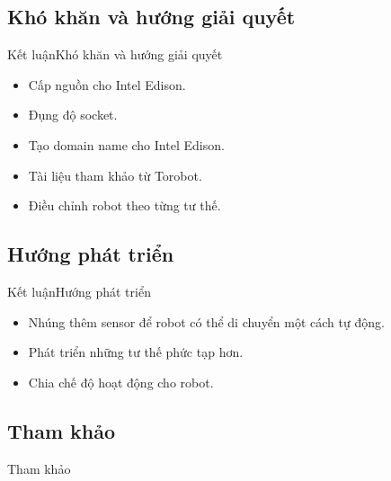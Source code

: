 \documentclass[compress, blue, 13pt,hyperref={pdfpagemode=FullScreen}]{beamer}
\begin{document}
\subsection{Khó khăn và hướng giải quyết}
\begin{frame}{Kết luận}{Khó khăn và hướng giải quyết}
\begin{itemize}
\item Cấp nguồn cho Intel Edison.
\item Đụng độ socket.
\item Tạo domain name cho Intel Edison.
\item Tài liệu tham khảo từ Torobot.
\item Điều chỉnh robot theo từng tư thế.
\end{itemize}
\end{frame}
\subsection{Hướng phát triển}
\begin{frame}{Kết luận}{Hướng phát triển}
\begin{itemize}
\item Nhúng thêm sensor để robot có thể di chuyển một cách tự động.
\item Phát triển những tư thế phức tạp hơn. 
\item Chia chế độ hoạt động cho robot.
\end{itemize}
\end{frame}
\subsection{Tham khảo}
\begin{frame}{Tham khảo}

\end{frame}
\section*{}
\begin{frame}
\transdissolve
\begin{center}
\begin{Huge}
\color{blue}{Cảm ơn các thầy/cô đã lắng nghe}
\end{Huge}
\end{center}
\end{frame}
\end{document}
